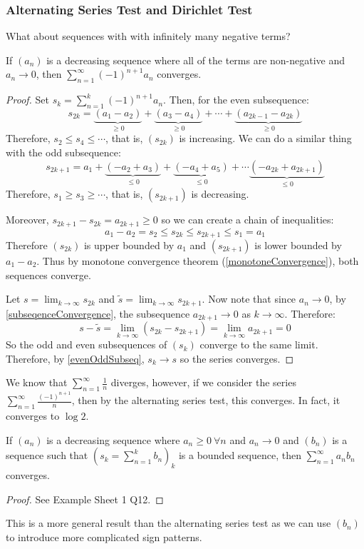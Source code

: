 \documentclass[../main.tex]{subfiles}
\begin{document}
\subsubsection{Alternating Series Test and Dirichlet Test}
What about sequences with with infinitely many negative terms?
\begin{proposition}
  If $(a_n)$ is a decreasing sequence where all of the terms are non-negative and $a_n \to 0$, then $\sum_{n = 1}^{\infty} (-1)^{n + 1}a_n$ converges.
\end{proposition}
\begin{proof}
  Set $s_k = \sum_{n = 1}^{k} (-1)^{n + 1} a_n$. Then, for the even subsequence:
  \[
    s_{2k} = \underbrace{(a_1 - a_2)}_{\geq0} + \underbrace{(a_3 - a_4)}_{\geq 0} + \cdots + \underbrace{(a_{2k - 1} - a_{2k})}_{\geq 0}
  \]
  Therefore, $s_2 \leq s_4 \leq \cdots$, that is, $(s_{2k})$ is increasing.
  We can do a similar thing with the odd subsequence:
  \[
    s_{2k + 1} = a_1 + \underbrace{(-a_2 + a_3)}_{\leq 0} + \underbrace{(-a_4 + a_5)}_{\leq 0} + \cdots \underbrace{(-a_{2k} + a_{2k + 1})}_{\leq 0}
  \]
  Therefore, $s_1 \geq s_3 \geq \cdots$, that is, $(s_{2k + 1})$ is decreasing.

  Moreover, $s_{2k + 1} - s_{2k} = a_{2k + 1} \geq 0$ so we can create a chain of inequalities:
  \[
    a_1 - a_2 = s_2 \leq s_{2k} \leq s_{2k + 1} \leq s_1 = a_1
  \]
  Therefore $(s_{2k})$ is upper bounded by $a_1$ and $(s_{2k + 1})$ is lower bounded by $a_1 - a_2$.
  Thus by monotone convergence theorem (\cref{monotoneConvergence}), both sequences converge.

  Let $s = \lim_{k \to \infty} s_{2k}$ and $\widetilde{s} = \lim_{k \to \infty} s_{2k + 1}$.
  Now note that since $a_n \to 0$, by \cref{subseqenceConvergence}, the subsequence $a_{2k + 1} \to 0$ as $k \to \infty$.
  Therefore:
  \[
    s - \widetilde{s} = \lim_{k \to \infty} (s_{2k} - s_{2k + 1}) = \lim_{k \to \infty} a_{2k + 1} = 0
  \]
  So the odd and even subsequences of $(s_k)$ converge to the same limit.
  Therefore, by \cref{evenOddSubseq}, $s_k \to s$ so the series converges.
\end{proof}
\begin{example}
  \label{absoluteConvergenceCE}
  We know that $\sum_{n = 1}^{\infty} \frac{1}{n}$ diverges, however, if we consider the series $\sum_{n = 1}^{\infty} \frac{(-1)^{n + 1}}{n}$, then by the alternating series test, this converges.
  In fact, it converges to $\log 2$.
\end{example}
\begin{proposition}
  If $(a_n)$ is a decreasing sequence where $a_n \geq 0\ \forall n$ and $a_n \to 0$ and $(b_n)$ is a sequence such that $(s_k = \sum_{n = 1}^{k} b_n)_k$ is a bounded sequence, then $\sum_{n = 1}^{\infty} a_n b_n$ converges.
\end{proposition}
\begin{proof}
  See Example Sheet 1 Q12.
\end{proof}
\begin{remark}
  This is a more general result than the alternating series test as we can use $(b_n)$ to introduce more complicated sign patterns.
\end{remark}
\end{document}
